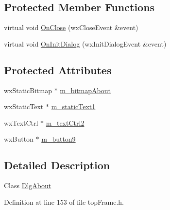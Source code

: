 \subsection*{Protected Member Functions}
\begin{DoxyCompactItemize}
\item 
virtual void \hyperlink{class_dlg_about_a3253b689497f4c6399d24c67ba78b51e}{On\-Close} (wx\-Close\-Event \&event)
\item 
virtual void \hyperlink{class_dlg_about_a442a568cf1b87a5d52a588b212f474f3}{On\-Init\-Dialog} (wx\-Init\-Dialog\-Event \&event)
\end{DoxyCompactItemize}
\subsection*{Protected Attributes}
\begin{DoxyCompactItemize}
\item 
wx\-Static\-Bitmap $\ast$ \hyperlink{class_dlg_about_a7c406607035a55b453d7edcce9566c34}{m\-\_\-bitmap\-About}
\item 
wx\-Static\-Text $\ast$ \hyperlink{class_dlg_about_adce6520e7385ff5ff3f032c4ed44bc14}{m\-\_\-static\-Text1}
\item 
wx\-Text\-Ctrl $\ast$ \hyperlink{class_dlg_about_adc2a2d88de8cb15fcc4c9c943153df27}{m\-\_\-text\-Ctrl2}
\item 
wx\-Button $\ast$ \hyperlink{class_dlg_about_a21c9c302df2e7f154ff410c732e6846f}{m\-\_\-button9}
\end{DoxyCompactItemize}


\subsection{Detailed Description}
Class \hyperlink{class_dlg_about}{Dlg\-About} 

Definition at line 153 of file top\-Frame.\-h.



